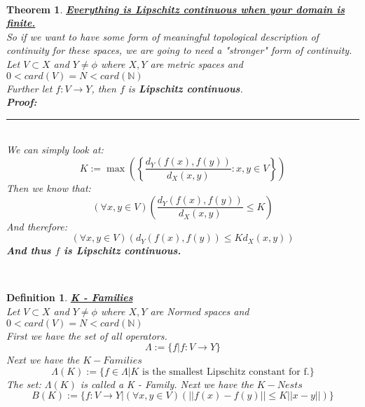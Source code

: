\documentclass[12pt]{extarticle}
\theoremstyle{plain}
\newtheorem{thm}{Theorem}[section]
\theoremstyle{plain}
\theoremstyle{plain}
\theoremstyle{Definition}
\newtheorem{def.}{Definition}[section]
\theoremstyle{Definition}
\theoremstyle{plain}
\theoremstyle{plain}
\newcommand{\cut}[0]{\noindent\framebox[\linewidth]{\rule{\linewidth}{2pt}}\\}
\newcommand{\prof}[0]{	\noindent \textbf{Proof:} \rule{500pt}{2pt} \\ }
\begin{document}
	\cut
	\begin{thm} \underline{\textbf{Everything is Lipschitz continuous when your domain is finite.}} \\
		So if we want to have some form of meaningful topological description of continuity for these spaces, we are going to need a "stronger" form of continuity. \\
		Let $V \subset X$ and $Y \not = \phi$ where $X,Y$ are metric spaces and $0 < card(V) = N < card(\mathbb{N})$ \\
		Further let $f : V \to Y$, then $f$ is \textbf{Lipschitz continuous}. \\
		\prof
		We can simply look at: \\
		$$K := \max\left( \left\{\frac{d_Y(f(x),f(y))}{d_X(x,y)} : x,y \in V \right\} \right)$$
		Then we know that: 
		$$(\forall x,y \in V)\left( \frac{d_Y(f(x),f(y))}{d_X(x,y)} \leq K\right)$$
		And therefore: \\ 
		$$(\forall x,y \in V)\left( d_Y(f(x),f(y)) \leq Kd_X(x,y)\right)$$
		\textbf{And thus $f$ is Lipschitz continuous.} \\ 
	\end{thm}
	\cut
	\begin{def.} \underline{\textbf{K - Families}} \\ 
		Let $V \subset X$ and $Y \not = \phi$ where $X,Y$ are Normed spaces and $0 < card(V) = N < card(\mathbb{N})$ \\
		First we have the set of all operators.  
		$$\Lambda := \{f | f : V \to Y\}$$
		Next we have the $K - Families$ 
		$$\Lambda(K) := \{f \in \Lambda | K \text{ is the smallest Lipschitz constant for f.}\}$$
		The set: $\Lambda(K)$ is called a K - Family. 
		Next we have the $K - Nests$ 
		$$B(K) := \{f : V \to Y | (\forall x,y \in V) (||f(x) - f(y)|| \leq K ||x - y||)\}$$
	\end{def.}
	\cut
\end{document}
